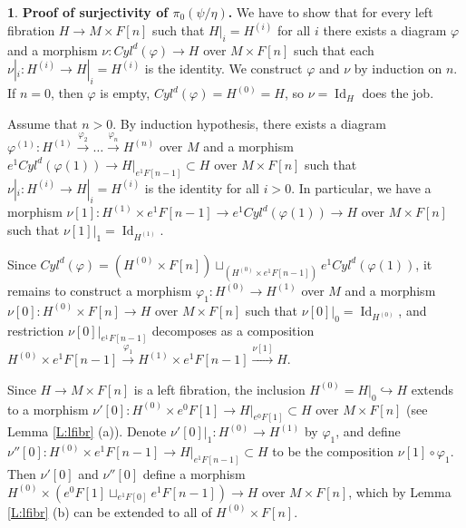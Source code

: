\documentclass[12pt]{amsart}
\theoremstyle{plain}
\theoremstyle{definition}
\newtheorem{Emp}[Thm]{}
\numberwithin{equation}{section}
\newcommand{\lra}{\longrightarrow}
\newcommand{\hra}{\hookrightarrow}
\newcommand{\rl}[1]{Lemma \ref{L:#1}}
\newcommand{\Id}{\operatorname{Id}}
\begin{document}
\begin{Emp} \label{E:step5}
{\bf Proof of surjectivity of $\pi_0(\psi/\eta)$.} We have to show
that for every left fibration $H\to M\times F[n]$ such that
$H|_i=H^{(i)}$ for all $i$ there exists a diagram $\varphi$ and a
morphism $\nu:Cyl^d(\varphi)\to H$ over $M\times F[n]$ such that
each $\nu|_i:H^{(i)}\to H|_i=H^{(i)}$ is the identity. We
construct $\varphi$ and $\nu$ by induction on $n$. If $n=0$, then
$\varphi$ is empty, $Cyl^d(\varphi)=H^{(0)}=H$, so $\nu=\Id_H$
does the job.

Assume that $n>0$. By induction hypothesis, there exists a diagram
\\ $\varphi^{(1)}:H^{(1)}\overset{\varphi_2}{\lra}\ldots
\overset{\varphi_n}{\lra} H^{(n)}$ over $M$ and a morphism $e^1
Cyl^d(\varphi(1))\to H|_{e^1 F[n-1]}\subset H$ over $M\times F[n]$
such that $\nu|_i:H^{(i)}\to H|_i=H^{(i)}$ is the identity for all
$i>0$. In particular, we have a morphism $\nu[1]:H^{(1)}\times
e^1 F[n-1]\to e^1 Cyl^d(\varphi(1))\to H$ over $M\times F[n]$ such that
$\nu[1]|_1=\Id_{H^{(1)}}$.

Since $Cyl^d(\varphi)=(H^{(0)}\times F[n])\sqcup_{(H^{(0)}\times
e^1 F[n-1])}e^1 Cyl^d(\varphi(1))$, it remains to construct a
morphism $\varphi_1:H^{(0)}\to H^{(1)}$ over $M$ and a morphism
$\nu[0]:H^{(0)}\times F[n]\to H$ over $M\times F[n]$ such that
$\nu[0]|_0=\Id_{H^{(0)}}$, and restriction $\nu[0]|_{e^1 F[n-1]}$
decomposes as a composition $H^{(0)}\times e^1
F[n-1]\overset{\varphi_1}{\lra} H^{(1)}\times e^1
F[n-1]\overset{\nu[1]}{\lra}H$.

Since $H\to M\times F[n]$ is a left fibration, the inclusion
$H^{(0)}=H|_0\hra H$ extends to a morphism $\nu'[0]:H^{(0)}\times
e^0 F[1]\to H|_{e^0 F[1]}\subset H$ over $M\times F[n]$ (see
\rl{lfibr} (a)). Denote $\nu'[0]|_1:H^{(0)}\to H^{(1)}$ by
$\varphi_1$, and define $\nu''[0]:H^{(0)}\times e^1 F[n-1]\to
H|_{e^1 F[n-1]}\subset H$ to be the composition
$\nu[1]\circ\varphi_1$. Then $\nu'[0]$ and $\nu''[0]$ define a
morphism $H^{(0)}\times (e^0 F[1]\sqcup_{e^1 F[0]}e^1 F[n-1])\to H$
over $M\times F[n]$, which by \rl{lfibr} (b) can
be extended to all of $H^{(0)}\times F[n]$. 
\end{Emp}
\end{document}
